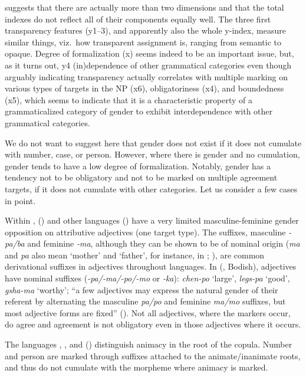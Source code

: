 \documentclass[output=collectionpaper]{langsci/langscibook}
\begin{document}
 suggests that there are actually more than two dimensions and that the total indexes do not reflect all of their components equally well. The three first transparency features (y1--3), and apparently also the whole y-index, measure similar things, viz.\ how transparent assignment is, ranging from semantic to opaque. Degree of formalization (x) seems indeed to be an important issue, but, as it turns out, y4 (in)dependence of other grammatical categories \textendash{} even though arguably indicating transparency \textendash{} actually correlates with multiple marking on various types of targets in the NP (x6), obligatoriness (x4), and boundedness (x5), which seems to indicate that it is a characteristic property of a grammaticalized category of gender to exhibit interdependence with other grammatical categories.

We do not want to suggest here that gender does not exist if it does not cumulate with number, case, or person. However, where there is gender and no cumulation, gender tends to have a low degree of formalization. Notably, gender has a tendency not to be obligatory and not to be marked on multiple agreement targets, if it does not cumulate with other categories. Let us consider a few cases in point.

Within ,  (\citealt[21]{Driem1987}) and other  languages (\citealt[508]{Ebert2003a}) have a very limited masculine-feminine gender opposition on attributive adjectives (one target type). The suffixes, masculine  \textit{-pa/ba} and feminine \textit{-ma}, although they can be shown to be of nominal origin (\textit{ma} and \textit{pa} also mean `mother' and `father', for instance, in ; \citealt[535]{Ebert2003b}), are common derivational suffixes in adjectives throughout  languages. In  (, Bodish), adjectives have nominal suffixes (\mbox{\textit{-pa/}}\mbox{\textit{-ma/}}\mbox{\textit{-po/}}\mbox{\textit{-mo}} or \textit{-ka}): \textit{chen-po} `large', \textit{legs-pa} `good', \textit{gsha-ma} `worthy'; ``a few adjectives may express the natural gender of their referent by alternating the masculine \textit{pa/po} and feminine \textit{ma/mo} suffixes, but most adjective forms are fixed'' (\citealt[373]{DeLancey2003}). Not all adjectives, where the markers occur, do agree and agreement is not obligatory even in those adjectives where it occurs.

The  languages , , and  () distinguish animacy in the root of the copula. Number and person are marked through suffixes attached to the animate/inanimate roots, and thus do not cumulate with the morpheme where animacy is marked.
\end{document}
